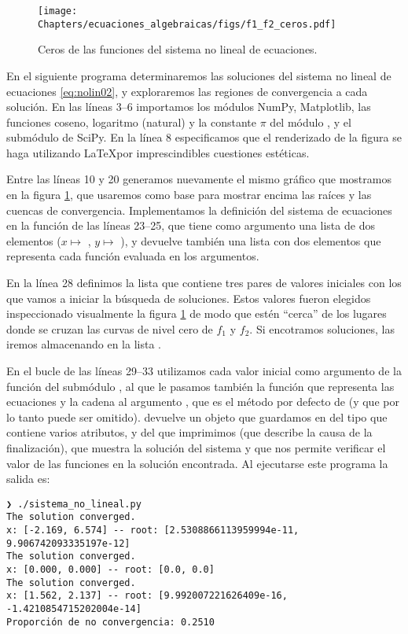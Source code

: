 
\begin{figure}[t]
 \centering
 \texttt{[image: Chapters/ecuaciones\_algebraicas/figs/f1\_f2\_ceros.pdf]}
 \caption{Ceros de las funciones del sistema no lineal de ecuaciones.}
 \label{fig:nolin01}
\end{figure}

En el siguiente programa determinaremos las soluciones del sistema no lineal de ecuaciones \eqref{eq:nolin02}, y exploraremos las regiones de convergencia a cada solución. En las líneas 3--6 importamos los módulos NumPy, Matplotlib, las funciones coseno, logaritmo (natural) y la constante $\pi$ del módulo , y el submódulo  de SciPy. En la línea 8 especificamos que el renderizado de la figura se haga utilizando \LaTeX por imprescindibles cuestiones estéticas.


Entre las líneas 10 y 20 generamos nuevamente el mismo gráfico que mostramos en la figura \ref{fig:nolin01}, que usaremos como base para mostrar encima las raíces y las cuencas de convergencia. Implementamos la definición del sistema de ecuaciones en la función  de las líneas 23--25, que tiene como argumento una lista de dos elementos ($x \mapsto$ , $y \mapsto$ ), y devuelve también una lista con dos elementos que representa cada función evaluada en los argumentos.

En la línea 28 definimos la lista  que contiene tres pares de valores iniciales con los que vamos a iniciar la búsqueda de soluciones. Estos valores fueron elegidos inspeccionado visualmente la figura \ref{fig:nolin01} de modo que estén ``cerca'' de los lugares donde se cruzan las curvas de nivel cero de $f_1$ y $f_2$. Si encotramos soluciones, las iremos almacenando en la lista .

En el bucle de las líneas 29--33 utilizamos cada valor inicial como argumento de la función  del submódulo , al que le pasamos también la función  que representa las ecuaciones y la cadena  al argumento , que es el método por defecto de  (y que por lo tanto puede ser omitido).  devuelve un objeto que guardamos en  del tipo  que contiene varios atributos, y del que imprimimos  (que describe la causa de la finalización),  que muestra la solución del sistema y  que nos permite verificar el valor de las funciones en la solución encontrada. Al ejecutarse este programa la salida es:
\begin{verbatim}
❯ ./sistema_no_lineal.py 
The solution converged.
x: [-2.169, 6.574] -- root: [2.5308866113959994e-11, 9.906742093335197e-12]
The solution converged.
x: [0.000, 0.000] -- root: [0.0, 0.0]
The solution converged.
x: [1.562, 2.137] -- root: [9.992007221626409e-16, -1.4210854715202004e-14]
Proporción de no convergencia: 0.2510
\end{verbatim}


